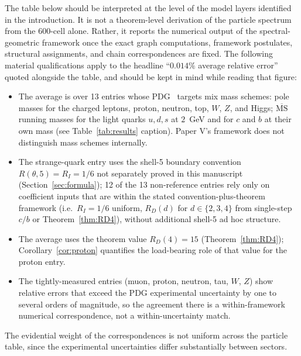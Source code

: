 \documentclass[12pt]{article}
\begin{document}
The table below should be interpreted at the level of the model layers identified in the introduction. It is not a theorem-level derivation of the particle spectrum from the 600-cell alone. Rather, it reports the numerical output of the spectral-geometric framework once the exact graph computations, framework postulates, structural assignments, and chain correspondences are fixed. The following material qualifications apply to the headline ``$0.014\%$ average relative error'' quoted alongside the table, and should be kept in mind while reading that figure:
\begin{itemize}
    \item The average is over 13 entries whose PDG~\citep{Workman2022} targets mix mass schemes: pole masses for the charged leptons, proton, neutron, top, $W$, $Z$, and Higgs; $\overline{\mathrm{MS}}$ running masses for the light quarks $u, d, s$ at $2$~GeV and for $c$ and $b$ at their own mass (see Table~\ref{tab:results} caption). Paper V's framework does not distinguish mass schemes internally.
    \item The strange-quark entry uses the shell-5 boundary convention $R(\theta, 5) = R_I = 1/6$ not separately proved in this manuscript (Section~\ref{sec:formula}); 12 of the 13 non-reference entries rely only on coefficient inputs that are within the stated convention-plus-theorem framework (i.e.\ $R_I = 1/6$ uniform, $R_D(d)$ for $d \in \{2, 3, 4\}$ from single-step $c/b$ or Theorem~\ref{thm:RD4}), without additional shell-5 ad hoc structure.
    \item The average uses the theorem value $R_D(4) = 15$ (Theorem~\ref{thm:RD4}); Corollary~\ref{cor:proton} quantifies the load-bearing role of that value for the proton entry.
    \item The tightly-measured entries (muon, proton, neutron, tau, $W$, $Z$) show relative errors that exceed the PDG experimental uncertainty by one to several orders of magnitude, so the agreement there is a within-framework numerical correspondence, not a within-uncertainty match.
\end{itemize}
The evidential weight of the correspondences is not uniform across the particle table, since the experimental uncertainties differ substantially between sectors.
\end{document}
